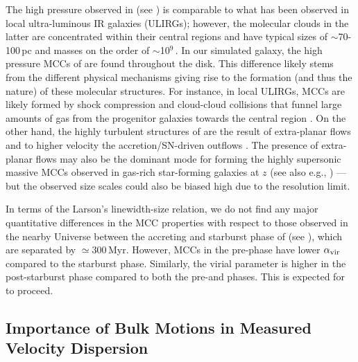 \IfFileExists{emulateapjlegacy.cls}{\documentclass[iop]{emulateapjlegacy}}{\documentclass[iop]{emulateapj}}
\begin{document}
The high pressure observed in \flower (see \citealt{Pallottini17a})
is comparable to what has been observed in local ultra-luminous IR galaxies (ULIRGs); however, the molecular clouds in the latter are concentrated within their central regions and have typical sizes of $\sim$70-100\,pc and masses on the order of $\sim$10$^9$\,\Msun \citep{Downes98a, Sakamoto08a}. In our simulated galaxy, the high pressure MCCs of \flower are found throughout the disk. This difference likely stems from the different physical mechanisms giving rise to the formation (and thus the nature) of these molecular structures.
%
For instance, in local ULIRGs, MCCs are likely formed by shock compression and cloud-cloud collisions that funnel large amounts of gas from the progenitor galaxies towards the central region \citep{Tan00a, Wu18a}.
On the other hand, the highly turbulent structures of \flower are the result of extra-planar flows \citep{kohandel:2019} and to higher velocity the accretion/SN-driven outflows \citep{gallerani:2018}. The presence of extra-planar flows may also be the dominant mode for forming the highly supersonic massive MCCs observed in gas-rich star-forming galaxies at $z$ (see also e.g., \citealt{Swinbank11a}) --- but the observed size scales could also be biased high due to the resolution limit.

In terms of the Larson's linewidth-size relation, we do not find any major quantitative differences
in the MCC properties with respect to those observed in the nearby Universe
between the accreting and starburst phase of \flower (see
), which are separated by $\simeq$300\,Myr.
However, MCCs in the pre-\SB phase have lower $\alpha_{\rm vir}$ compared to the starburst phase.
Similarly, the virial parameter is higher in the post-starburst phase compared to both the pre-\SB and \SB phases.
This is expected for \SF to proceed.

\subsection{Importance of Bulk Motions in Measured Velocity Dispersion} \label{sec:rot}
\end{document}
